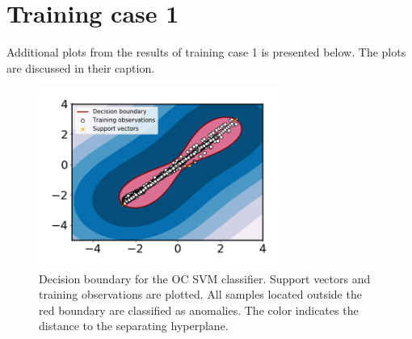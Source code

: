         
    
        
        

\chapter{Training case 1}\label{appendix:training_case1}
    Additional plots from the results of training case 1 is presented below. The plots are discussed in their caption.
    \begin{figure}
        \centering
        \includegraphics[width=0.7\textwidth]{report/figures/analysis/plant1_training/svm_boundary.png}
        \caption{Decision boundary for the OC SVM classifier. Support vectors and training observations are plotted. All samples located outside the red boundary are classified as anomalies. The color indicates the distance to the separating hyperplane.}
    \end{figure}
    

